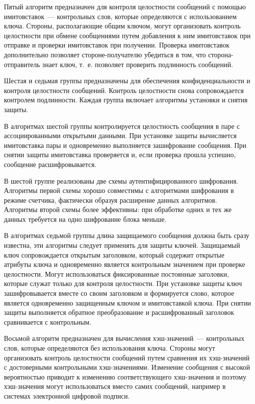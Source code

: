 Пятый алгоритм предназначен для контроля целостности сообщений
с помощью имитовставок~--- контрольных слов, 
которые определяются с использованием ключа.
%
Стороны, располагающие общим ключом, 
могут организовать контроль целостности при обмене сообщениями
путем добавления к ним имитовставок при отправке 
и проверки имитовставок при получении.
%
Проверка имитовставок дополнительно позволяет стороне-получателю 
убедиться в том, что сторона-отправитель знает ключ,
т.~е. позволяет проверить подлинность сообщений.

Шестая и седьмая группы предназначены для обеспечения конфиденциальности 
и контроля целостности сообщений. 
%
Контроль целостности снова сопровождается контролем подлинности.
%
Каждая группа включает алгоритмы установки и снятия защиты. 

В алгоритмах шестой группы контролируется целостность сообщения в паре с 
ассоциированными открытыми данными. 
%
При установке защиты вычисляется имитовставка пары и одновременно 
выполняется зашифрование сообщения. 
%
При снятии защиты имитовставка проверяется и,
если проверка прошла успешно, сообщение расшифровывается.

В шестой группе реализованы две схемы аутентифицированного шифрования.
%
Алгоритмы первой схемы хорошо совместимы с алгоритмами шифрования в режиме счетчика, 
фактически образуя расширение данных алгоритмов.
%
Алгоритмы второй схемы более эффективны: при обработке одних и тех же данных  
требуется на одно шифрование блока меньше.

В алгоритмах седьмой группы длина защищаемого сообщения должна быть сразу известна,
эти алгоритмы следует применять для защиты ключей.
Защищаемый ключ сопровождается открытым заголовком, 
который содержит открытые атрибуты ключа и одновременно
является контрольным значением при проверке целостности. 
%
Могут использоваться фиксированные постоянные заголовки, 
которые служат только для контроля целостности.
%
При установке защиты ключ зашифровывается вместе со своим заголовком
и формируется слово, которое является одновременно 
защищенным ключом и имитовставкой ключа.
%
При снятии защиты выполняется обратное преобразование
и расшифрованный заголовок сравнивается с контрольным.

Восьмой алгоритм предназначен для вычисления
хэш-значений~--- контрольных слов, 
которые определяются без использования ключа.
%
Стороны могут организовать контроль целостности сообщений
путем сравнения их хэш-значений с достоверными контрольными хэш-значениями.
%
Изменение сообщения с высокой вероятностью
приводит к изменению соответствующего хэш-значения
и поэтому хэш-значения могут использоваться вместо самих сообщений,
например в системах электронной цифровой подписи.


